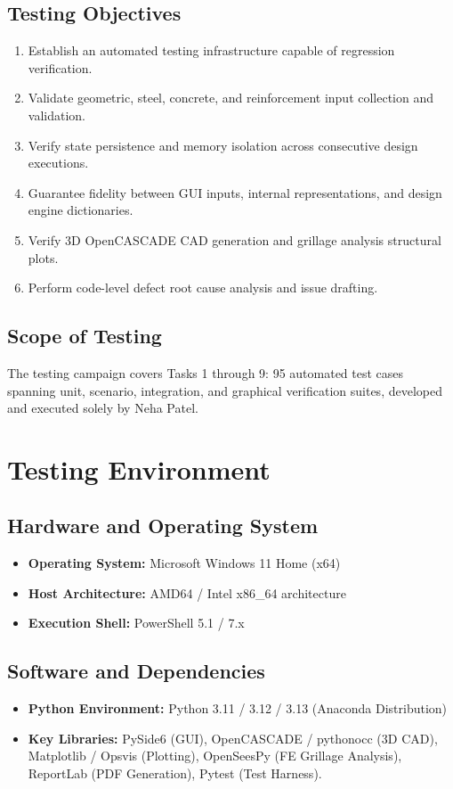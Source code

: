 \documentclass[11pt,a4paper]{report}
\begin{document}
\section{Testing Objectives}
\begin{enumerate}
    \item Establish an automated testing infrastructure capable of regression verification.
    \item Validate geometric, steel, concrete, and reinforcement input collection and validation.
    \item Verify state persistence and memory isolation across consecutive design executions.
    \item Guarantee fidelity between GUI inputs, internal representations, and design engine dictionaries.
    \item Verify 3D OpenCASCADE CAD generation and grillage analysis structural plots.
    \item Perform code-level defect root cause analysis and issue drafting.
\end{enumerate}

\section{Scope of Testing}
The testing campaign covers Tasks 1 through 9: 95 automated test cases spanning unit, scenario, integration, and graphical verification suites, developed and executed solely by Neha Patel.

\chapter{Testing Environment}
\section{Hardware and Operating System}
\begin{itemize}
    \item \textbf{Operating System:} Microsoft Windows 11 Home (x64)
    \item \textbf{Host Architecture:} AMD64 / Intel x86\_64 architecture
    \item \textbf{Execution Shell:} PowerShell 5.1 / 7.x
\end{itemize}

\section{Software and Dependencies}
\begin{itemize}
    \item \textbf{Python Environment:} Python 3.11 / 3.12 / 3.13 (Anaconda Distribution)
    \item \textbf{Key Libraries:} PySide6 (GUI), OpenCASCADE / pythonocc (3D CAD), Matplotlib / Opsvis (Plotting), OpenSeesPy (FE Grillage Analysis), ReportLab (PDF Generation), Pytest (Test Harness).
\end{itemize}
\end{document}
